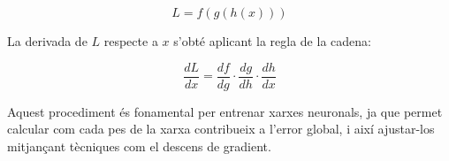 \[
L = f(g(h(x)))
\]

La derivada de \( L \) respecte a \( x \) s'obté aplicant la regla de la cadena:

\[
\frac{dL}{dx} = \frac{df}{dg} \cdot \frac{dg}{dh} \cdot \frac{dh}{dx}
\]

Aquest procediment és fonamental per entrenar xarxes neuronals, ja que permet calcular com cada pes de la xarxa contribueix a l'error global, i així ajustar-los mitjançant tècniques com el descens de gradient.




